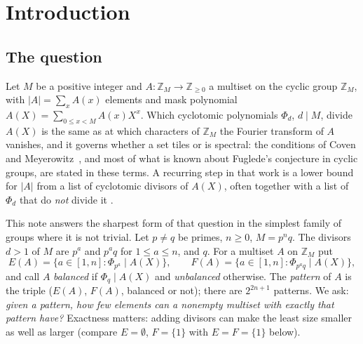 \documentclass[11pt,a4paper]{amsart}
\theoremstyle{definition}
\theoremstyle{remark}
\newcommand{\Z}{\mathbb{Z}}
\begin{document}
\section{Introduction}

\subsection{The question} Let $M$ be a positive integer and $A\colon\Z_M\to\Z_{\ge 0}$ a multiset on the
cyclic group $\Z_M$, with $|A|=\sum_x A(x)$ elements and mask polynomial $A(X)=\sum_{0\le x<M}A(x)X^x$. Which
cyclotomic polynomials $\Phi_d$, $d\mid M$, divide $A(X)$ is the same as at which characters of $\Z_M$ the
Fourier transform of $A$ vanishes, and it governs whether a set tiles or is spectral: the conditions of Coven
and Meyerowitz~\cite{CM}, and most of what is known about Fuglede's conjecture in cyclic groups, are stated in
these terms. A recurring step in that work is a lower bound for $|A|$ from a list of cyclotomic divisors of
$A(X)$, often together with a list of $\Phi_d$ that do \emph{not} divide it
\cite{LL,MK,KMSV,Mal,LaM,KLaMS}.

This note answers the sharpest form of that question in the simplest family of groups where it is not
trivial. Let $p\ne q$ be primes, $n\ge 0$, $M=p^nq$. The divisors $d>1$ of $M$ are $p^a$ and $p^aq$ for
$1\le a\le n$, and $q$. For a multiset $A$ on $\Z_M$ put
\[ E(A)=\{a\in[1,n]:\Phi_{p^a}\mid A(X)\},\qquad F(A)=\{a\in[1,n]:\Phi_{p^aq}\mid A(X)\}, \]
and call $A$ \emph{balanced} if $\Phi_q\mid A(X)$ and \emph{unbalanced} otherwise. The \emph{pattern} of $A$
is the triple ($E(A)$, $F(A)$, balanced or not); there are $2^{2n+1}$ patterns. We ask: \emph{given a pattern,
how few elements can a nonempty multiset with exactly that pattern have?} Exactness matters: adding divisors
can make the least size smaller as well as larger (compare $E=\emptyset$, $F=\{1\}$ with $E=F=\{1\}$ below).
\end{document}
